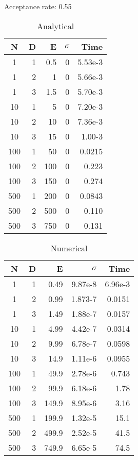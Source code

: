 \documentclass[english, a4paper]{article}
\begin{document}
Acceptance rate: 0.55

\begin{table}[H]
  \centering
  \begin{tabular}{ | c | r | r | r | r |}
    \hline
    N& D& E& $\sigma$& Time \\*
    \hline
    1& 1& 0.5& 0& 5.53e-3 \\*
    \hline
    1& 2& 1& 0&  5.66e-3\\*
    \hline
    1& 3& 1.5& 0&  5.70e-3\\*
    \hline
    10& 1& 5& 0&  7.20e-3\\*
    \hline
    10& 2& 10& 0&  7.36e-3\\*
    \hline
    10& 3& 15& 0&  1.00-3\\*
    \hline
    100& 1& 50& 0&  0.0215\\*
    \hline
    100& 2& 100& 0&  0.223\\*
    \hline
    100& 3& 150& 0&  0.274\\*
    \hline
    500& 1& 200& 0&  0.0843\\*
    \hline
    500& 2& 500& 0&  0.110\\*
    \hline
    500& 3& 750& 0&  0.131\\*
    \hline
  \end{tabular}
  \caption{Analytical}
  \label{tab:Tabell1}
\end{table}

\begin{table}[H]
  \centering
  \begin{tabular}{ | c | r | r | r | r |}
    \hline
    N& D& E& $\sigma$& Time \\*
    \hline
    1& 1& 0.49& 9.87e-8& 6.96e-3 \\*
    \hline
    1& 2& 0.99& 1.873-7&  0.0151\\*
    \hline
    1& 3& 1.49& 1.88e-7&  0.0157\\*
    \hline
    10& 1& 4.99& 4.42e-7&  0.0314\\*
    \hline
    10& 2& 9.99& 6.78e-7&  0.0598\\*
    \hline
    10& 3& 14.9& 1.11e-6&  0.0955\\*
    \hline
    100& 1& 49.9& 2.78e-6&  0.743\\*
    \hline
    100& 2& 99.9& 6.18e-6&  1.78\\*
    \hline
    100& 3& 149.9& 8.95e-6&  3.16\\*
    \hline
    500& 1& 199.9& 1.32e-5&  15.1\\*
    \hline
    500& 2& 499.9& 2.52e-5&  41.5\\*
    \hline
    500& 3& 749.9& 6.65e-5&  74.5\\*
    \hline
  \end{tabular}
  \caption{Numerical}
  \label{tab:Tabell1}
\end{table}
\end{document}

